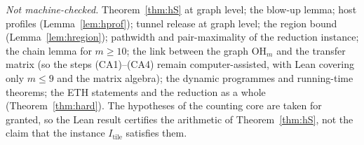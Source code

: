 \emph{Not machine-checked.} Theorem~\ref{thm:hS} at graph level; the blow-up lemma; host profiles (Lemma~\ref{lem:hprof}); tunnel release at graph level; the region bound (Lemma~\ref{lem:hregion}); pathwidth and pair-maximality of the reduction instance; the chain lemma for $m\ge10$; the link between the graph $\mathrm{OH}_m$ and the transfer matrix (so the steps (CA1)--(CA4) remain computer-assisted, with Lean covering only $m\le9$ and the matrix algebra); the dynamic programmes and running-time theorems; the ETH statements and the reduction as a whole (Theorem~\ref{thm:hard}). The hypotheses of the counting core are taken for granted, so the Lean result certifies the arithmetic of Theorem~\ref{thm:hS}, not the claim that the instance $I_{\mathrm{tile}}$ satisfies them.
